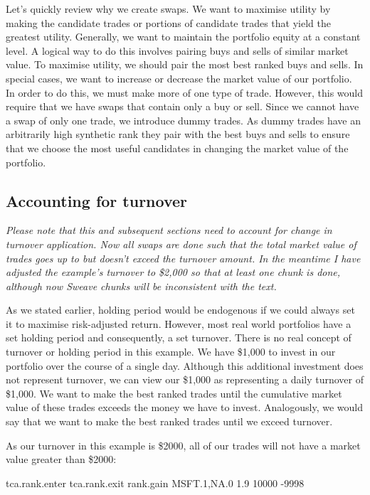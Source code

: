 \documentclass{article}
\begin{document}
Let's quickly review why we create swaps.  We want to maximise utility
by making the candidate trades or portions of candidate trades that
yield the greatest  utility.  Generally, we want to maintain
the portfolio equity at a constant level.  A logical way to do this
involves pairing buys and sells of similar market value.  To maximise
utility, we should pair the most best ranked buys and sells.  In
special cases, we want to increase or decrease the market value
of our portfolio.  In order to do this, we must make more of one type
of trade.  However, this would require that we have swaps that contain
only a buy or sell.  Since we cannot have a swap of only one trade, we
introduce dummy trades.  As dummy trades have an arbitrarily high
synthetic rank they pair with the best buys and sells to ensure that
we choose the most useful candidates in changing the market value of
the portfolio.

\subsection{Accounting for turnover}

\emph{Please note that this and subsequent sections need to account
  for change in turnover application.  Now all swaps are done such
  that the total market value of trades goes up to but doesn't exceed
  the turnover amount.  In the meantime I have adjusted the example's
  turnover to \$2,000 so that at least one chunk is done, although now
  Sweave chunks will be inconsistent with the text.}

As we stated earlier, holding period would be endogenous if
we could always set it to maximise risk-adjusted return.  However,
most real world portfolios have a set holding period and consequently,
a set turnover.  There is no real concept of turnover or holding
period in this example.  We have \$1,000 to invest in our portfolio
over the course of a single day.  Although this additional investment
does not represent turnover, we can view our \$1,000 as representing a
daily turnover of \$1,000.  We want to make the best ranked trades
until the cumulative market value of these trades exceeds the money we
have to invest.  Analogously, we would say that we want to make the
best ranked trades until we exceed turnover.

As our turnover in this example is \$2000, all of our
trades will not have a market value greater than
\$2000:

\begin{Schunk}
\begin{Soutput}
            tca.rank.enter tca.rank.exit rank.gain
MSFT.1,NA.0            1.9         10000     -9998
\end{Soutput}
\end{Schunk}
\end{document}
